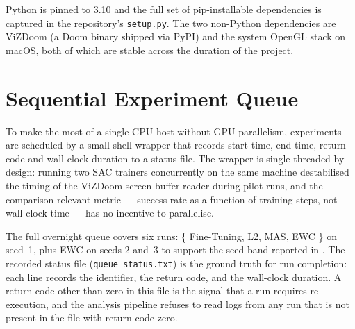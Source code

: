 Python is pinned to 3.10 and the full set of pip-installable
dependencies is captured in the repository's \texttt{setup.py}.
The two non-Python dependencies are ViZDoom (a Doom binary
shipped via PyPI) and the system OpenGL stack on macOS, both of
which are stable across the duration of the project.

\section{Sequential Experiment Queue}
\label{sec:queue}

To make the most of a single CPU host without GPU parallelism,
experiments are scheduled by a small shell wrapper that records
start time, end time, return code and wall-clock duration to a
status file. The wrapper is single-threaded by design: running
two SAC trainers concurrently on the same machine destabilised
the timing of the ViZDoom screen buffer reader during pilot
runs, and the comparison-relevant metric --- success rate as a
function of training steps, not wall-clock time --- has no
incentive to parallelise.


The full overnight queue covers six runs:
\{ Fine-Tuning, L2, MAS, EWC \} on seed~1, plus EWC on seeds 2
and~3 to support the seed band reported in .
The recorded status file (\texttt{queue\_status.txt}) is the
ground truth for run completion: each line records the
identifier, the return code, and the wall-clock duration. A
return code other than zero in this file is the signal that a
run requires re-execution, and the analysis pipeline refuses to
read logs from any run that is not present in the file with
return code zero.

